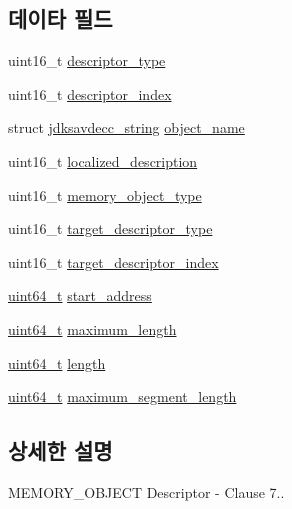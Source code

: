 \subsection*{데이타 필드}
\begin{DoxyCompactItemize}
\item 
uint16\+\_\+t \hyperlink{structjdksavdecc__descriptor__memory__object_ab7c32b6c7131c13d4ea3b7ee2f09b78d}{descriptor\+\_\+type}
\item 
uint16\+\_\+t \hyperlink{structjdksavdecc__descriptor__memory__object_a042bbc76d835b82d27c1932431ee38d4}{descriptor\+\_\+index}
\item 
struct \hyperlink{structjdksavdecc__string}{jdksavdecc\+\_\+string} \hyperlink{structjdksavdecc__descriptor__memory__object_a7d1f5945a13863b1762fc6db74fa8f80}{object\+\_\+name}
\item 
uint16\+\_\+t \hyperlink{structjdksavdecc__descriptor__memory__object_a0926f846ca65a83ad5bb06b4aff8f408}{localized\+\_\+description}
\item 
uint16\+\_\+t \hyperlink{structjdksavdecc__descriptor__memory__object_a836ed1042ae19b71bdb4c8d8822c39e8}{memory\+\_\+object\+\_\+type}
\item 
uint16\+\_\+t \hyperlink{structjdksavdecc__descriptor__memory__object_a37cbc6edcac0d8d8c2006c0d6f3c00af}{target\+\_\+descriptor\+\_\+type}
\item 
uint16\+\_\+t \hyperlink{structjdksavdecc__descriptor__memory__object_a25114746ea494f3fcb88975177992d78}{target\+\_\+descriptor\+\_\+index}
\item 
\hyperlink{parse_8c_aec6fcb673ff035718c238c8c9d544c47}{uint64\+\_\+t} \hyperlink{structjdksavdecc__descriptor__memory__object_a435fb25eb186ac591e661f3f1253de25}{start\+\_\+address}
\item 
\hyperlink{parse_8c_aec6fcb673ff035718c238c8c9d544c47}{uint64\+\_\+t} \hyperlink{structjdksavdecc__descriptor__memory__object_a8dac25844edd7e5d8700e9d8dd2427a3}{maximum\+\_\+length}
\item 
\hyperlink{parse_8c_aec6fcb673ff035718c238c8c9d544c47}{uint64\+\_\+t} \hyperlink{structjdksavdecc__descriptor__memory__object_a190b76b1f3d5bd26920300e5f073739b}{length}
\item 
\hyperlink{parse_8c_aec6fcb673ff035718c238c8c9d544c47}{uint64\+\_\+t} \hyperlink{structjdksavdecc__descriptor__memory__object_ad3a8958ab9a1311bfdbe722130bb3944}{maximum\+\_\+segment\+\_\+length}
\end{DoxyCompactItemize}


\subsection{상세한 설명}
M\+E\+M\+O\+R\+Y\+\_\+\+O\+B\+J\+E\+CT Descriptor -\/ Clause 7.. 

